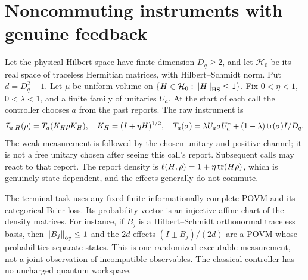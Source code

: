 \section{Noncommuting instruments with genuine feedback}\label{sec:quantum}
Let the physical Hilbert space have finite dimension $D_q\ge2$, and let $\mathcal H_0$ be its real space of traceless Hermitian matrices, with Hilbert--Schmidt norm. Put $d=D_q^2-1$. Let $\mu$ be uniform volume on $\{H\in\mathcal H_0:\left\lVert H\right\rVert_{\mathrm{HS}}\le1\}$. Fix $0<\eta<1$, $0<\lambda<1$, and a finite family of unitaries $U_a$. At the start of each call the controller chooses $a$ from the past reports. The raw instrument is
\begin{equation}\label{eq:quantum-raw}
 \mathcal I_{a,H}(\rho)=T_a(K_H\rho K_H),\quad
 K_H=(I+\eta H)^{1/2},\quad
 T_a(\sigma)=\lambda U_a\sigma U_a^*
                   +(1-\lambda)\operatorname{tr}(\sigma)I/D_q.
\end{equation}
The weak measurement is followed by the chosen unitary and positive channel; it is not a free unitary chosen after seeing this call's report. Subsequent calls may react to that report. The report density is
$\ell(H,\rho)=1+\eta\operatorname{tr}(H\rho)$, which is genuinely state-dependent, and the effects generally do not commute.

The terminal task uses any fixed finite informationally complete POVM and its categorical Brier loss. Its probability vector is an injective affine chart of the density matrices. For instance, if $B_j$ is a Hilbert--Schmidt orthonormal traceless basis, then $\left\lVert B_j\right\rVert_{\rm op}\le1$ and the $2d$ effects $(I\pm B_j)/(2d)$ are a POVM whose probabilities separate states. This is one randomized executable measurement, not a joint observation of incompatible observables. The classical controller has no uncharged quantum workspace.

